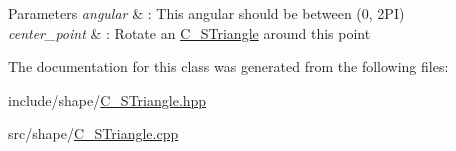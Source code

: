 \begin{DoxyParams}{Parameters}
{\em angular} & \+: This angular should be between (0, 2\+PI) \\
\hline
{\em center\+\_\+point} & \+: Rotate an \hyperlink{classC__STriangle}{C\+\_\+\+S\+Triangle} around this point \\
\hline
\end{DoxyParams}


The documentation for this class was generated from the following files\+:\begin{DoxyCompactItemize}
\item 
include/shape/\hyperlink{C__STriangle_8hpp}{C\+\_\+\+S\+Triangle.\+hpp}\item 
src/shape/\hyperlink{C__STriangle_8cpp}{C\+\_\+\+S\+Triangle.\+cpp}\end{DoxyCompactItemize}
